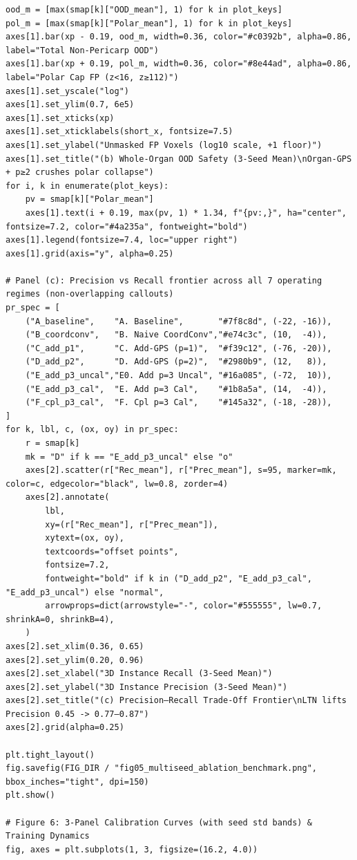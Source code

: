 \documentclass[10pt,a4paper]{article}
\renewcommand{\_}{\origunderscore\allowbreak}
\begin{document}
\begin{codebox}
\begin{lstlisting}[style=pybmed]
ood_m = [max(smap[k]["OOD_mean"], 1) for k in plot_keys]
pol_m = [max(smap[k]["Polar_mean"], 1) for k in plot_keys]
axes[1].bar(xp - 0.19, ood_m, width=0.36, color="#c0392b", alpha=0.86, label="Total Non-Pericarp OOD")
axes[1].bar(xp + 0.19, pol_m, width=0.36, color="#8e44ad", alpha=0.86, label="Polar Cap FP (z<16, z≥112)")
axes[1].set_yscale("log")
axes[1].set_ylim(0.7, 6e5)
axes[1].set_xticks(xp)
axes[1].set_xticklabels(short_x, fontsize=7.5)
axes[1].set_ylabel("Unmasked FP Voxels (log10 scale, +1 floor)")
axes[1].set_title("(b) Whole-Organ OOD Safety (3-Seed Mean)\nOrgan-GPS + p≥2 crushes polar collapse")
for i, k in enumerate(plot_keys):
    pv = smap[k]["Polar_mean"]
    axes[1].text(i + 0.19, max(pv, 1) * 1.34, f"{pv:,}", ha="center", fontsize=7.2, color="#4a235a", fontweight="bold")
axes[1].legend(fontsize=7.4, loc="upper right")
axes[1].grid(axis="y", alpha=0.25)

# Panel (c): Precision vs Recall frontier across all 7 operating regimes (non-overlapping callouts)
pr_spec = [
    ("A_baseline",    "A. Baseline",       "#7f8c8d", (-22, -16)),
    ("B_coordconv",   "B. Naive CoordConv","#e74c3c", (10,  -4)),
    ("C_add_p1",      "C. Add-GPS (p=1)",  "#f39c12", (-76, -20)),
    ("D_add_p2",      "D. Add-GPS (p=2)",  "#2980b9", (12,   8)),
    ("E_add_p3_uncal","E0. Add p=3 Uncal", "#16a085", (-72,  10)),
    ("E_add_p3_cal",  "E. Add p=3 Cal",    "#1b8a5a", (14,  -4)),
    ("F_cpl_p3_cal",  "F. Cpl p=3 Cal",    "#145a32", (-18, -28)),
]
for k, lbl, c, (ox, oy) in pr_spec:
    r = smap[k]
    mk = "D" if k == "E_add_p3_uncal" else "o"
    axes[2].scatter(r["Rec_mean"], r["Prec_mean"], s=95, marker=mk, color=c, edgecolor="black", lw=0.8, zorder=4)
    axes[2].annotate(
        lbl,
        xy=(r["Rec_mean"], r["Prec_mean"]),
        xytext=(ox, oy),
        textcoords="offset points",
        fontsize=7.2,
        fontweight="bold" if k in ("D_add_p2", "E_add_p3_cal", "E_add_p3_uncal") else "normal",
        arrowprops=dict(arrowstyle="-", color="#555555", lw=0.7, shrinkA=0, shrinkB=4),
    )
axes[2].set_xlim(0.36, 0.65)
axes[2].set_ylim(0.20, 0.96)
axes[2].set_xlabel("3D Instance Recall (3-Seed Mean)")
axes[2].set_ylabel("3D Instance Precision (3-Seed Mean)")
axes[2].set_title("(c) Precision–Recall Trade-Off Frontier\nLTN lifts Precision 0.45 -> 0.77–0.87")
axes[2].grid(alpha=0.25)

plt.tight_layout()
fig.savefig(FIG_DIR / "fig05_multiseed_ablation_benchmark.png", bbox_inches="tight", dpi=150)
plt.show()

# Figure 6: 3-Panel Calibration Curves (with seed std bands) & Training Dynamics
fig, axes = plt.subplots(1, 3, figsize=(16.2, 4.0))


\end{lstlisting}
\end{codebox}
\end{document}
